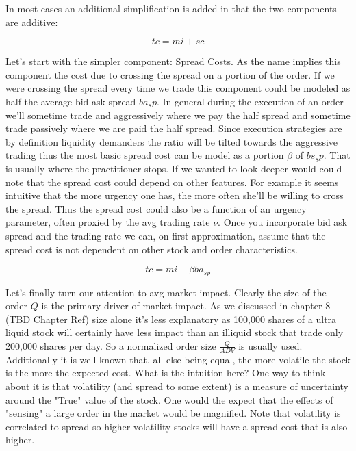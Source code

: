 In most cases an additional simplification is added in that the two components are additive:

 \begin{equation}\label{eq:tc_2}
		tc = mi + sc
\end{equation}
 
Let's start with the simpler component: Spread Costs. As the name implies this component the cost due to crossing the spread on a portion of the order. If we were crossing the spread every time we trade this component could be modeled as half the average bid ask spread $ba_sp$. In general during the execution of an order we'll sometime trade  and aggressively where we pay the half spread and sometime trade passively where we are paid the half spread. Since execution strategies are by definition liquidity demanders the ratio will be tilted towards the aggressive trading thus the most basic spread cost can be model as a portion $\beta$ of $bs_sp$. That is usually where the practitioner stops. If we wanted to look deeper would could note that the spread cost could depend on other features. For example it seems intuitive that the more urgency one has, the more often she'll be willing to cross the spread. Thus the spread cost could also be a function of an urgency parameter, often proxied by the avg trading rate $\nu$.  Once you incorporate bid ask spread and the trading rate we can, on first approximation, assume that the spread cost is not dependent on other stock and order characteristics.

\begin{equation}\label{eq:tc_3}
		tc = mi + \beta ba_{sp}
\end{equation}

Let's finally turn our attention to avg market impact. Clearly the size of the order $Q$ is the primary driver of market impact. As we discussed in chapter 8 (TBD Chapter Ref) size alone it's less explanatory as 100,000 shares of a ultra liquid stock will certainly have less impact than an illiquid stock that trade only 200,000 shares per day. So a normalized order size $\frac{Q}{ADV}$ is usually used. Additionally it is well known that, all else being equal, the more volatile the stock is the more the expected cost. What is the intuition here? One way to think about it is that volatility (and spread to some extent) is a measure of  uncertainty around the "True" value of the stock. One would the expect that the effects of "sensing" a large order in the market would be magnified. Note that volatility is correlated to spread so higher volatility stocks will have a spread cost that is also higher.

